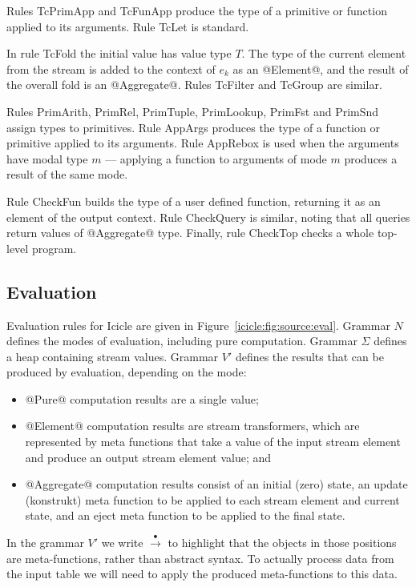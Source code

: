Rules TcPrimApp and TcFunApp produce the type of a primitive or function applied to its arguments. Rule TcLet is standard.

In rule TcFold the initial value has value type $T$. The type of the current element from the stream is added to the context of $e_k$ as an @Element@, and the result of the overall fold is an @Aggregate@. Rules TcFilter and TcGroup are similar.

Rules PrimArith, PrimRel, PrimTuple, PrimLookup, PrimFst and \mbox{PrimSnd} assign types to primitives.
Rule AppArgs produces the type of a function or primitive applied to its arguments.
Rule AppRebox is used when the arguments have modal type $m$ --- applying a function to arguments of mode $m$ produces a result of the same mode.

Rule CheckFun builds the type of a user defined function, returning it as an element of the output context. Rule CheckQuery is similar, noting that all queries return values of @Aggregate@ type. Finally, rule CheckTop checks a whole top-level program.


\subsection{Evaluation}


Evaluation rules for Icicle are given in Figure~\ref{icicle:fig:source:eval}.
Grammar $N$ defines the modes of evaluation, including pure computation.
Grammar $\Sigma$ defines a heap containing stream values.
Grammar $V'$ defines the results that can be produced by evaluation, depending on the mode:
\begin{itemize}
\item
@Pure@ computation results are a single value;
\item
@Element@ computation results are stream transformers, which are represented by meta functions that take a value of the input stream element and produce an output stream element value; and
\item
@Aggregate@ computation results consist of an initial (zero) state, an update (konstrukt) meta function to be applied to each stream element and current state, and an eject meta function to be applied to the final state.
\end{itemize}

In the grammar $V'$ we write $\stackrel{\bullet}{\to}$ to highlight that the objects in those positions are meta-functions, rather than abstract syntax. To actually process data from the input table we will need to apply the produced meta-functions to this data.

